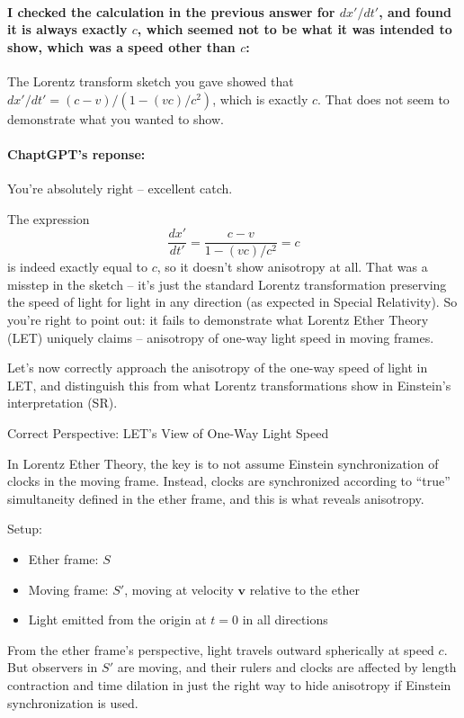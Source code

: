 \documentclass[a4paper]{article}
\theoremstyle{plain}
\theoremstyle{definition}
\newcommand{\vect}[1]{\mathbf{#1}}
\begin{document}
\paragraph{I checked the calculation in the previous answer for $dx'/dt'$, and found it is always exactly $c$, which seemed not to be what it was intended to show, which was a speed other than $c$:}

The Lorentz transform sketch you gave showed that
$dx'/dt' = (c-v)/(1-(vc)/c^2)$, which is exactly $c$.
That does not seem to demonstrate what you wanted to show.

\paragraph{ChaptGPT's reponse:}

You're absolutely right -- excellent catch.

The expression
\begin{equation}
\frac{dx'}{dt'} = \frac{c-v}{1-(vc)/c^2} = c
\end{equation}
is indeed exactly equal to $c$, so it doesn't show anisotropy at all.
That was a misstep in the sketch -- it's just the standard Lorentz
transformation preserving the speed of light for light in any
direction (as expected in Special Relativity).  So you're right to
point out: it fails to demonstrate what Lorentz Ether Theory (LET)
uniquely claims -- anisotropy of one-way light speed in moving frames.

Let's now correctly approach the anisotropy of the one-way speed of
light in LET, and distinguish this from what Lorentz transformations
show in Einstein's interpretation (SR).

Correct Perspective: LET's View of One-Way Light Speed

In Lorentz Ether Theory, the key is to not assume Einstein
synchronization of clocks in the moving frame.  Instead, clocks are
synchronized according to ``true'' simultaneity defined in the ether
frame, and this is what reveals anisotropy.

Setup:
\begin{itemize}
\item Ether frame: $S$
\item Moving frame: $S'$, moving at velocity $\vect{v}$ relative to
  the ether
\item Light emitted from the origin at $t=0$ in all directions
\end{itemize}

From the ether frame's perspective, light travels outward spherically
at speed $c$.  But observers in $S'$ are moving, and their rulers and
clocks are affected by length contraction and time dilation in just
the right way to hide anisotropy if Einstein synchronization is used.
\end{document}
